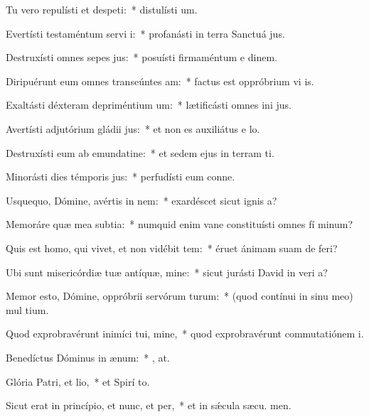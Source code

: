 \item Tu vero repulísti et despeti:~* distulísti  um.
\item Evertísti testaméntum servi i:~* profanásti in terra Sanctuá jus.
\item Destruxísti omnes sepes jus:~* posuísti firmaméntum e dinem.
\item Diripuérunt eum omnes transeúntes am:~* factus est oppróbrium vi is.
\item Exaltásti déxteram depriméntium um:~* lætificásti omnes ini jus.
\item Avertísti adjutórium gládii jus:~* et non es auxiliátus e  lo.
\item Destruxísti eum ab emundatine:~* et sedem ejus in terram ti.
\item Minorásti dies témporis jus:~* perfudísti eum conne.
\item Usquequo, Dómine, avértis in nem:~* exardéscet sicut ignis  a?
\item Memoráre quæ mea subtia:~* numquid enim vane constituísti omnes fí minum?
\item Quis est homo, qui vivet, et non vidébit tem:~* éruet ánimam suam de  feri?
\item Ubi sunt misericórdiæ tuæ antíquæ, mine:~* sicut jurásti David in veri a?
\item Memor esto, Dómine, oppróbrii servórum turum:~* (quod contínui in sinu meo) mul tium.
\item Quod exprobravérunt inimíci tui, mine,~* quod exprobravérunt commutatiónem  i.
\item Benedíctus Dóminus in ænum:~* , at.
\item Glória Patri, et lio,~* et Spirí to.
\item Sicut erat in princípio, et nunc, et per,~* et in sǽcula sæcu. men.
